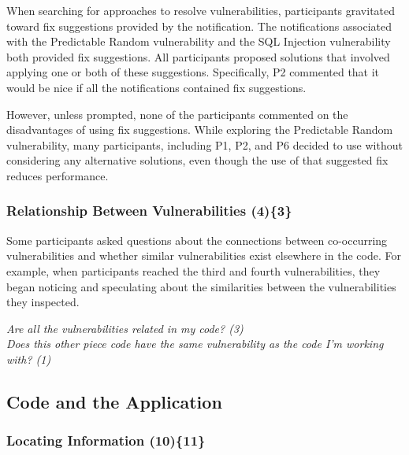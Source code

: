 \documentclass{acm_proc_article-sp}
\begin{document}
 
When searching for approaches to resolve vulnerabilities, participants gravitated toward fix suggestions provided by the notification.
The notifications associated with the Predictable Random vulnerability and the SQL Injection vulnerability both provided fix suggestions.
All participants proposed solutions that involved applying one or both of these suggestions. 
Specifically, P2 commented that it would be nice if all the notifications contained fix suggestions.

However, unless prompted, none of the participants commented on the disadvantages of using fix suggestions.
While exploring the Predictable Random vulnerability, many participants, including P1, P2, and P6 decided to use  without considering any alternative solutions, even though the use of that suggested fix reduces performance.




\subsubsection{\textbf{Relationship Between Vulnerabilities (4)\{3\}}}\label{rbb}

Some participants asked questions about the connections between co-occurring vulnerabilities and whether similar vulnerabilities exist elsewhere in the code. 
For example, when participants reached the third and fourth vulnerabilities, they began noticing and speculating about the similarities between the vulnerabilities they inspected.


\noindent\emph{Are all the vulnerabilities related in my code? (3)} \\
\emph{Does this other piece code have the same vulnerability as the code I'm working with? (1)} 



\subsection{Code and the Application}
\label{sec:results-ca}



\subsubsection{\textbf{Locating Information (10)\{11\}}}\label{li}
\end{document}
